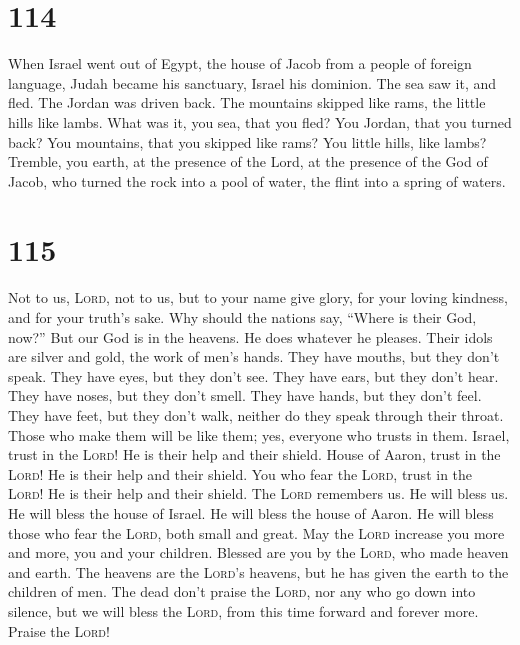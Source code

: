 \hypertarget{section-113}{%
\section{114}\label{section-113}}

 When Israel went out of Egypt, the house of Jacob from a
people of foreign language,  Judah became his sanctuary,
Israel his dominion.  The sea saw it, and fled. The Jordan
was driven back.  The mountains skipped like rams, the
little hills like lambs.  What was it, you sea, that you
fled? You Jordan, that you turned back?  You mountains,
that you skipped like rams? You little hills, like lambs? 
Tremble, you earth, at the presence of the Lord, at the presence of the
God of Jacob,  who turned the rock into a pool of water,
the flint into a spring of waters.

\hypertarget{section-114}{%
\section{115}\label{section-114}}

 Not to us, \textsc{Lord}, not to us, but to your name
give glory, for your loving kindness, and for your truth's sake.
 Why should the nations say, ``Where is their God, now?''
 But our God is in the heavens. He does whatever he
pleases.  Their idols are silver and gold, the work of
men's hands.  They have mouths, but they don't speak. They
have eyes, but they don't see.  They have ears, but they
don't hear. They have noses, but they don't smell.  They
have hands, but they don't feel. They have feet, but they don't walk,
neither do they speak through their throat.  Those who
make them will be like them; yes, everyone who trusts in them.
 Israel, trust in the \textsc{Lord}! He is their help and
their shield.  House of Aaron, trust in the
\textsc{Lord}! He is their help and their shield.  You
who fear the \textsc{Lord}, trust in the \textsc{Lord}! He is their help
and their shield.  The \textsc{Lord} remembers us. He
will bless us. He will bless the house of Israel. He will bless the
house of Aaron.  He will bless those who fear the
\textsc{Lord}, both small and great.  May the
\textsc{Lord} increase you more and more, you and your children.
 Blessed are you by the \textsc{Lord}, who made heaven
and earth.  The heavens are the \textsc{Lord}'s heavens,
but he has given the earth to the children of men.  The
dead don't praise the \textsc{Lord}, nor any who go down into silence,
 but we will bless the \textsc{Lord}, from this time
forward and forever more. Praise the \textsc{Lord}!

